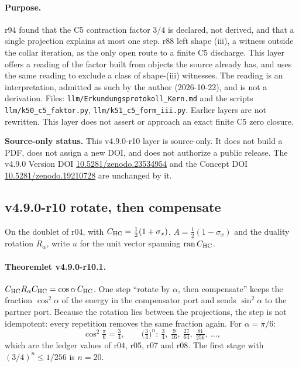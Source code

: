 \paragraph{Purpose.}
r94 found that the C5 contraction factor \(3/4\) is declared, not derived, and that a single projection explains at most
one step.  r88 left shape (iii), a witness outside the collar iteration, as the only open route to a finite C5 discharge.
This layer offers a reading of the factor built from objects the source already has, and uses the same reading to
exclude a class of shape-(iii) witnesses.  The reading is an interpretation, admitted as such by the author
(2026-10-22), and is not a derivation.  Files: \texttt{llm/Erkundungsprotokoll\_Kern.md} and the scripts
\texttt{llm/k50\_c5\_faktor.py}, \texttt{llm/k51\_c5\_form\_iii.py}.  Earlier layers are not rewritten.
This layer does not assert or approach an exact finite C5 zero closure.

\noindent\textbf{Source-only status.}
This v4.9.0-r10 layer is source-only.  It does not build a PDF, does not assign a new DOI,
and does not authorize a public release.  The v4.9.0 Version DOI
\href{https://doi.org/10.5281/zenodo.23534954}{10.5281/zenodo.23534954} and the Concept DOI
\href{https://doi.org/10.5281/zenodo.19210728}{10.5281/zenodo.19210728} are unchanged by it.

\subsection*{v4.9.0-r10 rotate, then compensate}
\label{subsec:v490-r10-rotate-compensate}

On the doublet of r04, with \(C_{\mathrm{HC}}=\tfrac12(1+\sigma_x)\), \(A=\tfrac12(1-\sigma_x)\) and the duality rotation
\(R_\alpha\), write \(u\) for the unit vector spanning \(\operatorname{ran}C_{\mathrm{HC}}\).

\paragraph{Theoremlet v4.9.0-r10.1.}
\(C_{\mathrm{HC}}R_\alpha C_{\mathrm{HC}}=\cos\alpha\,C_{\mathrm{HC}}\).  One step ``rotate by \(\alpha\), then compensate'' keeps the fraction
\(\cos^2\alpha\) of the energy in the compensator port and sends \(\sin^2\alpha\) to the partner port.  Because the rotation
lies between the projections, the step is not idempotent: every repetition removes the same fraction again.  For
\(\alpha=\pi/6\):
\[
\cos^2\tfrac\pi6=\tfrac34,\qquad
\bigl(\tfrac34\bigr)^n:\ \tfrac34,\ \tfrac9{16},\ \tfrac{27}{64},\ \tfrac{81}{256},\ \ldots,
\]
which are the ledger values of r04, r05, r07 and r08.  The first stage with \((3/4)^n\le1/256\) is \(n=20\).


